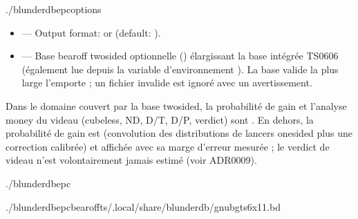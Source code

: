 \documentclass[letterpaper,10pt,english]{sphinxmanual}
\begin{document}
\begin{sphinxVerbatim}[commandchars=\\\{\}]
./blunderdbepc\PYG{o}{[}options\PYG{o}{]}
\end{sphinxVerbatim}

\sphinxAtStartPar
{}
\begin{itemize}
\item {} 
\sphinxAtStartPar
{} — Output format:  or  (default: ).

\item {} 
\sphinxAtStartPar
{} — Base bearoff two\sphinxhyphen{}sided optionnelle () élargissant
la base intégrée TS\sphinxhyphen{}06\sphinxhyphen{}06 (également lue depuis la variable d’environnement
). La base valide la plus large l’emporte ; un fichier
invalide est ignoré avec un avertissement.

\end{itemize}

\sphinxAtStartPar
{} Dans le domaine couvert par la base two\sphinxhyphen{}sided, la probabilité de
gain et l’analyse money du videau (cubeless, ND, D/T, D/P, verdict) sont
. En dehors, la probabilité de gain est  (convolution
des distributions de lancers one\sphinxhyphen{}sided plus une correction calibrée) et
affichée avec sa marge d’erreur mesurée ; le verdict de videau n’est
volontairement jamais estimé (voir ADR\sphinxhyphen{}0009).

\sphinxAtStartPar
{}

\begin{sphinxVerbatim}[commandchars=\\\{\}]
./blunderdbepc

./blunderdbepc\PYGZhy{}\PYGZhy{}bearoff\PYGZhy{}ts\PYGZti{}/.local/share/blunderdb/gnubg\PYGZus{}ts6x11.bd
\end{sphinxVerbatim}
\end{document}
